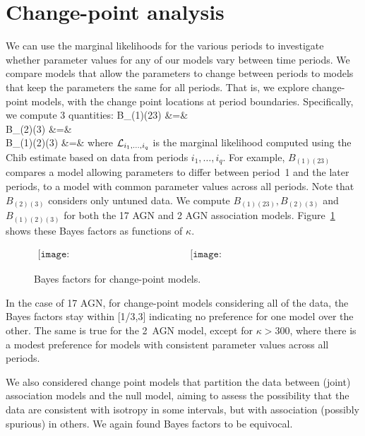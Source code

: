 \section{Change-point analysis}
\label{app:chgpt}

We can use the marginal likelihoods for the various periods to investigate
whether parameter values for any of our models vary between time periods. 
We compare models that allow the parameters to change between periods to
models that keep the parameters the same for all periods.  That is, we
explore change-point models, with the change point locations at period
boundaries.  Specifically, we compute 3 quantities:
\ba
B_{(1)(23)} &=& \nonumber\\
B_{(2)(3)} &=& \nonumber\\
B_{(1)(2)(3)} &=& 
\ea
where ${\cal L}_{i_1,\ldots,i_q}$ is the marginal likelihood computed using
the Chib estimate based on data from periods $i_1,\ldots,i_q$.
For example, $B_{(1)(23)}$ compares a model allowing parameters to differ
between period~1 and the later periods, to a model with common parameter
values across all periods.  Note that $B_{(2)(3)}$ considers only untuned
data.  We compute $B_{(1)(23)}, B_{(2)(3)}$ and $B_{(1)(2)(3)}$ for both the
17 AGN and 2 AGN association models. Figure~\ref{fig:changepoint} shows
these Bayes factors as functions of $\kappa$.

\begin{figure}
\centerline{$
\begin{array}{cc}
\texttt{[image: BF\_changepoint\_17AGNs.eps]} &
\texttt{[image: BF\_changepoint\_2AGNs.eps]}
\end{array}$}
\caption{Bayes factors for change-point models.}
\label{fig:changepoint}
\end{figure}

In the case of 17 AGN, for change-point models considering all of the data,
the Bayes factors stay within [1/3,3] indicating no preference for one model
over the other.
%
%
The same is true for the 2~AGN model, except for
$\kappa > 300$, where there is a modest preference for models with
consistent parameter values across all periods.

We also considered change point models that partition the data between
(joint) association models and the null model, aiming to assess the
possibility that the data are consistent with isotropy in some intervals,
but with association (possibly spurious) in others.  We again found
Bayes factors to be equivocal.  
